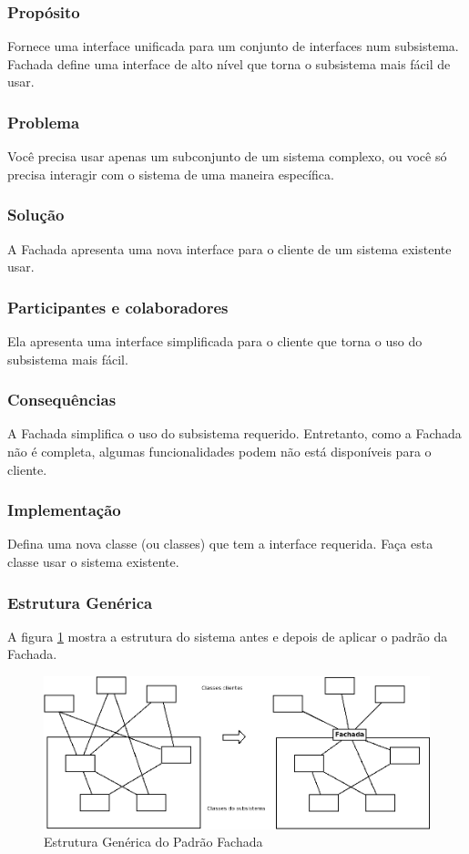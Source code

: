 \documentclass[
	11pt,				%
	openright,
	twoside,			%
	a4paper,			%
	english,			%
	french,
	brazil,				%
	sumario=tradicional
	]{abntex2}
\begin{document}
\subsubsection{Propósito}
Fornece uma interface unificada para um conjunto de interfaces num subsistema. Fachada define uma interface de alto nível que torna o subsistema mais fácil de usar.

\subsubsection{Problema}
Você precisa usar apenas um subconjunto de um sistema complexo, ou você só precisa interagir com o sistema de uma maneira específica.

\subsubsection{Solução}
A Fachada apresenta uma nova interface para o cliente de um sistema existente usar.

\subsubsection{Participantes e colaboradores}
Ela apresenta uma interface simplificada para o cliente que torna o uso do subsistema mais fácil.

\subsubsection{Consequências}
A Fachada simplifica o uso do subsistema requerido. Entretanto, como a Fachada não é completa, algumas funcionalidades podem não está disponíveis para o cliente.

\subsubsection{Implementação}
Defina uma nova classe (ou classes) que tem a interface requerida. Faça esta classe usar o sistema existente.

\subsubsection{Estrutura Genérica}
A figura \ref{fig:fachada} mostra a estrutura do sistema antes e depois de aplicar o padrão da Fachada.

\begin{figure}[h]
\begin{center}
\includegraphics[scale=0.45]{fachada.png}
\caption{Estrutura Genérica do Padrão Fachada}\label{fig:fachada}
\end{center}
\end{figure}
\end{document}
